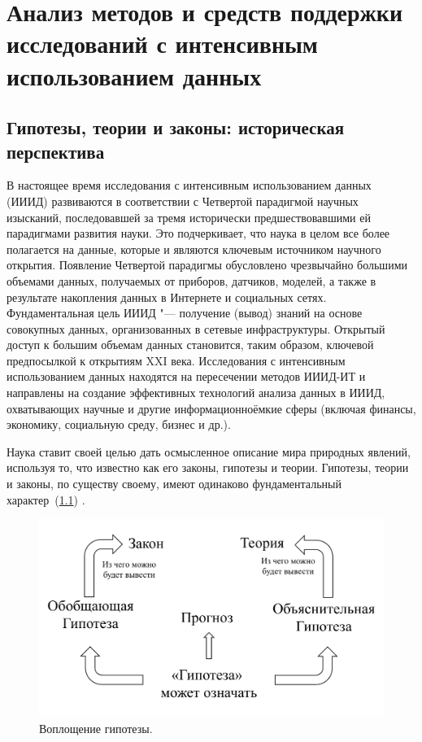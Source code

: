 \chapter{Анализ методов и средств поддержки исследований с интенсивным использованием данных} \label{chapt1}

\section{Гипотезы, теории и законы: историческая перспектива} \label{sect1_1}

В настоящее время исследования с интенсивным использованием данных (ИИИД) развиваются в соответствии с Четвертой 
парадигмой \cite{Hey2009} научных изысканий, последовавшей за тремя исторически предшествовавшими ей парадигмами 
развития науки. Это подчеркивает, что наука в целом все более полагается на данные, которые и являются ключевым 
источником научного открытия. Появление Четвертой парадигмы обусловлено чрезвычайно большими объемами данных, 
получаемых от приборов, датчиков, моделей, а также в результате накопления данных в Интернете и социальных сетях. 
Фундаментальная цель ИИИД "--- получение (вывод) знаний на основе совокупных данных, организованных в сетевые 
инфраструктуры. Открытый доступ к большим объемам данных становится, таким образом, ключевой предпосылкой к открытиям 
XXI века. Исследования с интенсивным использованием данных находятся на пересечении методов ИИИД-ИТ и направлены 
на создание эффективных технологий анализа данных в ИИИД, охватывающих научные и другие информационноёмкие сферы 
(включая финансы, экономику, социальную среду, бизнес и др.).



Наука ставит своей целью дать осмысленное описание мира природных явлений, используя то, что известно как его законы, 
гипотезы и теории. Гипотезы, теории и законы, по существу своему, имеют одинаково фундаментальный 
характер~(\cref{fig:hypothesis_repr}) \cite{McComas2005}. 

\begin{figure}[ht]
    \centering
    \includegraphics[width=0.7\linewidth]{images/hypothesis_life.pdf}
    \caption{Воплощение гипотезы.}\label{fig:hypothesis_repr}
\end{figure}

